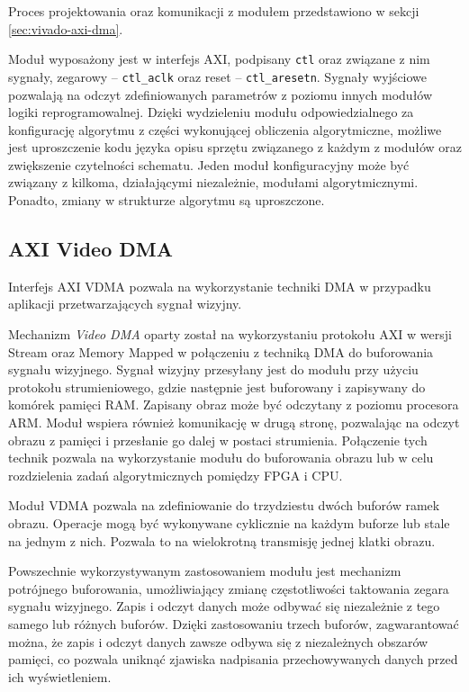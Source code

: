 Proces projektowania oraz komunikacji z modułem przedstawiono w sekcji \ref{sec:vivado-axi-dma}.

Moduł wyposażony jest w interfejs AXI, podpisany \texttt{ctl} oraz związane z nim sygnały, zegarowy -- \texttt{ctl\_aclk} oraz reset -- \texttt{ctl\_aresetn}. Sygnały wyjściowe pozwalają na odczyt zdefiniowanych parametrów z poziomu innych modułów logiki reprogramowalnej. Dzięki wydzieleniu modułu odpowiedzialnego za konfigurację algorytmu z części wykonującej obliczenia algorytmiczne, możliwe jest uproszczenie kodu języka opisu sprzętu związanego z każdym z modułów oraz zwiększenie czytelności schematu. Jeden moduł konfiguracyjny może być związany z kilkoma, działającymi niezależnie, modułami algorytmicznymi. Ponadto, zmiany w strukturze algorytmu są uproszczone.


\subsection{AXI Video DMA}
\label{sec:axi-vdma}
Interfejs AXI VDMA pozwala na wykorzystanie techniki DMA w przypadku aplikacji przetwarzających sygnał wizyjny.

Mechanizm \emph{Video DMA} oparty został na wykorzystaniu protokołu AXI w wersji Stream oraz Memory Mapped w połączeniu z techniką DMA do buforowania sygnału wizyjnego. 
Sygnał wizyjny przesyłany jest do modułu przy użyciu protokołu strumieniowego, gdzie następnie jest buforowany i zapisywany do komórek pamięci RAM. Zapisany obraz może być odczytany z poziomu procesora ARM. Moduł wspiera również komunikację w drugą stronę, pozwalając na odczyt obrazu z pamięci i przesłanie go dalej w postaci strumienia. Połączenie tych technik pozwala na wykorzystanie modułu do buforowania obrazu lub w celu rozdzielenia zadań algorytmicznych pomiędzy FPGA i CPU.

Moduł VDMA pozwala na zdefiniowanie do trzydziestu dwóch buforów ramek obrazu. Operacje mogą być wykonywane cyklicznie na każdym buforze lub stale na jednym z nich. Pozwala to na wielokrotną transmisję jednej klatki obrazu.

Powszechnie wykorzystywanym zastosowaniem modułu jest mechanizm potrójnego buforowania, umożliwiający zmianę częstotliwości taktowania zegara sygnału wizyjnego. Zapis i odczyt danych może odbywać się niezależnie z tego samego lub różnych buforów. Dzięki zastosowaniu trzech buforów, zagwarantować można, że zapis i odczyt danych zawsze odbywa się z niezależnych obszarów pamięci, co pozwala uniknąć zjawiska nadpisania przechowywanych danych przed ich wyświetleniem.

